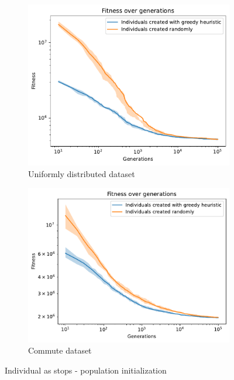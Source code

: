 \begin{figure}[b]
    \centering
    \begin{subfigure}[b]{0.45\textwidth}
        \includegraphics[width=\textwidth]{img/evo1_create_ind_random.pdf}
        \caption{Uniformly distributed dataset}
        \label{fig:evo1_cind_random}
    \end{subfigure}
    \begin{subfigure}[b]{0.45\textwidth}
        \includegraphics[width=\textwidth]{img/evo1_create_ind_commute.pdf}
        \caption{Commute dataset}
        \label{fig:evo1_cind_commute}
    \end{subfigure}
    \caption{Individual as stops - population initialization}
    \label{fig:evo1_create_ind}
\end{figure}

